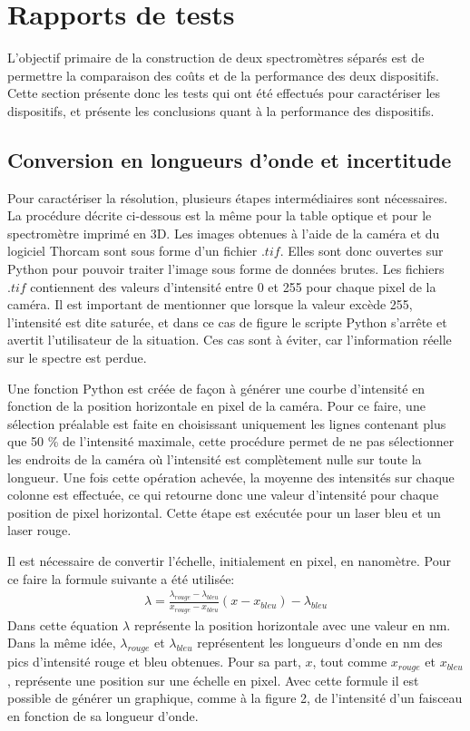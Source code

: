 \documentclass[11pt,letterpaper]{article}
\begin{document}
\section{Rapports de tests}

L'objectif primaire de la construction de deux spectromètres séparés est de permettre la 
comparaison des coûts et de la performance des deux dispositifs. Cette section présente
donc les tests qui ont été effectués pour caractériser les dispositifs, et présente les 
conclusions quant à la performance des dispositifs.

\subsection{Conversion en longueurs d'onde et incertitude}

Pour caractériser la résolution, plusieurs étapes intermédiaires sont nécessaires. La procédure décrite ci-dessous est la même 
pour la table optique et pour le spectromètre imprimé en 3D. 
Les images obtenues à l'aide de la caméra et du logiciel Thorcam sont sous forme d'un fichier $.tif$.
Elles sont donc ouvertes sur Python pour pouvoir traiter l'image sous forme de données brutes. Les fichiers $.tif$ 
contiennent des valeurs d'intensité entre 0 et 255 pour chaque pixel de la caméra. Il est important de mentionner
que lorsque la valeur excède 255, l'intensité est dite saturée, et dans ce cas de figure le scripte Python s'arrête et 
avertit l'utilisateur de la situation. Ces cas sont à éviter, car l'information réelle sur le spectre est perdue.

Une fonction Python est créée de façon à générer une courbe d'intensité en fonction de la position horizontale 
en pixel de la caméra. Pour ce faire, une sélection préalable est faite en choisissant uniquement les lignes 
contenant plus que 50 \% de l'intensité maximale, cette procédure permet de ne pas sélectionner les endroits de la caméra 
où l'intensité est complètement nulle sur toute la longueur. Une fois cette opération achevée, la moyenne des intensités sur chaque
colonne est effectuée, ce qui retourne donc une valeur d'intensité pour chaque position de pixel horizontal. Cette étape est exécutée pour 
un laser bleu et un laser rouge.

Il est nécessaire de convertir l'échelle, initialement en pixel, en nanomètre.
Pour ce faire la formule suivante a été utilisée: 
\begin{align}\label{eq1}
  \lambda =\frac{\lambda _{rouge}-\lambda _{bleu}}{x_{rouge}-x_{bleu}}(x-x_{bleu})-\lambda _{bleu}
\end{align}
Dans cette équation $\lambda $ représente la position horizontale avec une valeur en nm. Dans la même idée, 
$\lambda _{rouge}$ et $\lambda _{bleu}$ représentent les longueurs d'onde en nm des pics d'intensité rouge et bleu obtenues. 
Pour sa part, $x$, tout comme $x_{rouge}$ et $x_{bleu}$, représente une position sur une échelle en pixel.
Avec cette formule il est possible de générer un graphique, comme à la figure 2, de l'intensité d'un faisceau en fonction 
de sa longueur d'onde. 
\end{document}
